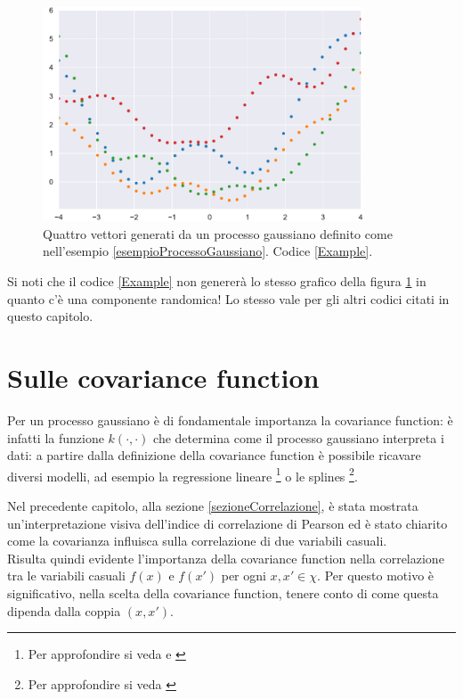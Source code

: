 \begin{ese}
\begin{figure}[h]
    \centering
    \includegraphics[width=0.85\textwidth]{images/Gaussian process/esempioProcessoGaussiano.pdf}
    \caption{Quattro vettori generati da un processo gaussiano definito come  nell'esempio \ref{esempioProcessoGaussiano}. Codice \ref{Example}.}
    \label{esempioProcessoGaussianoImmagine}
\end{figure}

Si noti che il codice \ref{Example} non genererà lo stesso grafico della figura \ref{esempioProcessoGaussianoImmagine} in quanto c'è una componente randomica! Lo stesso vale per gli altri codici citati in questo capitolo.
\end{ese}


\newpage




\section{Sulle covariance function}
Per un processo gaussiano è di fondamentale importanza la covariance function: è infatti la funzione $k(\cdot,\cdot)$ che determina come il processo gaussiano interpreta i dati: a partire dalla definizione della covariance function è possibile ricavare diversi modelli, ad esempio la regressione lineare \footnote{Per approfondire si veda \cite{rasmussen_gaussian_2006}  e  \cite{williams_prediction_1998}} o le splines \footnote{Per approfondire si veda \cite{kimeldorf_correspondence_1970}}.\\
\begin{oss}
Nel precedente capitolo, alla sezione \ref{sezioneCorrelazione}, è stata mostrata un'interpretazione visiva dell'indice di correlazione di Pearson ed è stato  chiarito come la covarianza influisca sulla correlazione di due variabili casuali.\\
Risulta quindi evidente l'importanza della covariance function nella correlazione tra le variabili casuali $f(x)$ e $f(x')$ per ogni $x,x'\in \chi$. Per questo motivo è significativo, nella scelta della covariance function, tenere conto di come questa dipenda dalla coppia $(x,x')$.
\end{oss}

